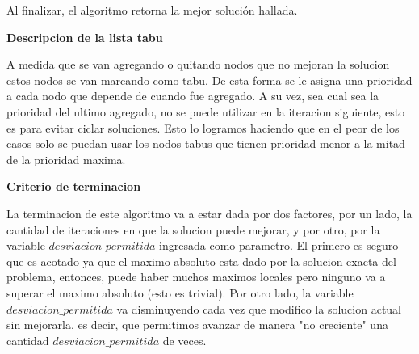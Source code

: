 Al finalizar, el algoritmo retorna la mejor solución hallada. \newline

\textbf{Descripcion de la lista tabu} \newline

 A medida que se van agregando o quitando nodos que no mejoran la solucion estos nodos se van marcando como tabu. De esta forma se le asigna una prioridad a cada nodo que depende de cuando fue agregado. A su vez, sea cual sea la prioridad del ultimo agregado, no se puede utilizar en la iteracion siguiente, esto es para evitar ciclar soluciones. Esto lo logramos haciendo que en el peor de los casos solo se puedan usar los nodos tabus que tienen prioridad menor a la mitad de la prioridad maxima. \newline

\textbf{Criterio de terminacion} \newline

 La terminacion de este algoritmo va a estar dada por dos factores, por un lado, la cantidad de iteraciones en que la solucion puede mejorar, y por otro, por la variable $desviacion\_permitida$ ingresada como parametro. El primero es seguro que es acotado ya que el maximo absoluto esta dado por la solucion exacta del problema, entonces, puede haber muchos maximos locales pero ninguno va a superar el maximo absoluto (esto es trivial). Por otro lado, la variable $desviacion\_permitida$ va disminuyendo cada vez que modifico la solucion actual sin mejorarla, es decir, que permitimos avanzar de manera "no creciente" una cantidad $desviacion\_permitida$ de veces. \newline


